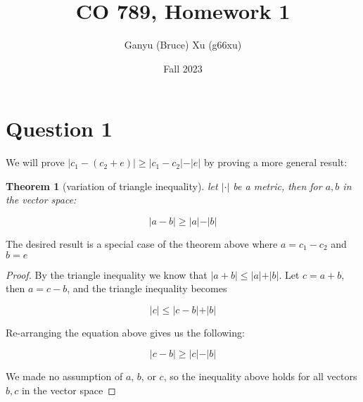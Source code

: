 \documentclass{article}
\title{CO 789, Homework 1}
\author{Ganyu (Bruce) Xu (g66xu)}
\date{Fall 2023}
\newcommand{\metric}[1]{\vert {#1} \vert}
\newtheorem{theorem}{Theorem}
\begin{document}

\section*{Question 1}

We will prove $\metric{c_1 - (c_2 + e)} \geq \metric{c_1 - c_2} - \metric{e}$ by proving a more general result:

\begin{theorem}[variation of triangle inequality]
    let $\vert \cdot \vert$ be a metric, then for $a, b$ in the vector space:

    \begin{equation*}
        \metric{a - b} \geq \metric{a} - \metric{b}
    \end{equation*}
\end{theorem}

The desired result is a special case of the theorem above where $a = c_1 - c_2$ and $b = e$

\begin{proof}
    By the triangle inequality we know that $\metric{a + b} \leq \metric{a} + \metric{b}$. Let $c = a + b$, then $a = c - b$, and the triangle inequality becomes

    \begin{equation*}
        \metric{c} \leq \metric{c - b} + \metric{b}
    \end{equation*}

    Re-arranging the equation above gives us the following:

    \begin{equation*}
        \metric{c - b} \geq \metric{c} - \metric{b}
    \end{equation*}

    We made no assumption of $a$, $b$, or $c$, so the inequality above holds for all vectors $b, c$ in the vector space
\end{proof}
\end{document}
